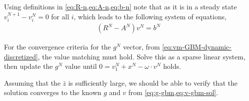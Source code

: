 \documentclass[11pt]{article}
\newcommand{\R}{\ensuremath{\mathbb{R}}}
\newcommand{\set}[1]{\ensuremath{\left\{{#1}\right\}}}
\begin{document}
Using definitions in \cref{eq:R-n,eq:A-n,eq:b-n} note that as it is in a steady state $v_i^{N+1} - v_i^N = 0$ for all $i$, which leads to the following system of equations,
\begin{align}
(R^N - A^N) v^N = b^N \label{eq:linear-system-N}
\end{align}


For the convergence criteria for the $g^N$ vector, from \cref{eq:vm-GBM-dynamic-discretized}, the value matching must hold.  Solve this as a sparse linear system, then update the $g^N$ value until $0 = v^N_1 + x^N - \omega \cdot v^N$ holds.

Assuming that the $\bar{z}$ is sufficiently large, we should be able to verify that the solution converges to the known $g$ and $v$ from \cref{eq:g-gbm,eq:v-gbm-sol}.
%
%	
\end{document}
